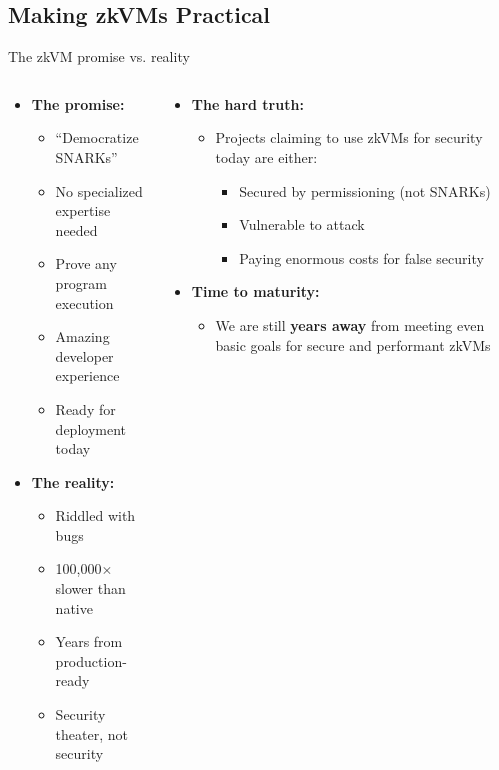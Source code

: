 \documentclass[aspectratio=169, lualatex, handout]{beamer}
\begin{document}
\subsection{Making zkVMs Practical}

\begin{frame}{The zkVM promise vs. reality}
	\begin{columns}[c]
		\begin{column}{0.5\textwidth}
			\begin{itemize}
				\item \textbf{The promise:}
				      \begin{itemize}
					      \item ``Democratize SNARKs''
					      \item No specialized expertise needed
					      \item Prove any program execution
					      \item Amazing developer experience
					      \item Ready for deployment today
				      \end{itemize}
				\item \textbf{The reality:}
				      \begin{itemize}
					      \item Riddled with bugs
					      \item 100,000$\times$ slower than native
					      \item Years from production-ready
					      \item Security theater, not security
				      \end{itemize}
			\end{itemize}
		\end{column}
		\begin{column}{0.5\textwidth}
			\begin{itemize}
				\item\textbf{The hard truth:}
				      \begin{itemize}
					      \item Projects claiming to use zkVMs for security today are either:
					            \begin{itemize}
						            \item Secured by permissioning (not SNARKs)
						            \item Vulnerable to attack
						            \item Paying enormous costs for false security
					            \end{itemize}
				      \end{itemize}
				\item \textbf{Time to maturity:}
				      \begin{itemize}
					      \item We are still \textbf{years away} from meeting even basic goals for secure and performant zkVMs
				      \end{itemize}
			\end{itemize}
		\end{column}
	\end{columns}
\end{frame}
\end{document}
